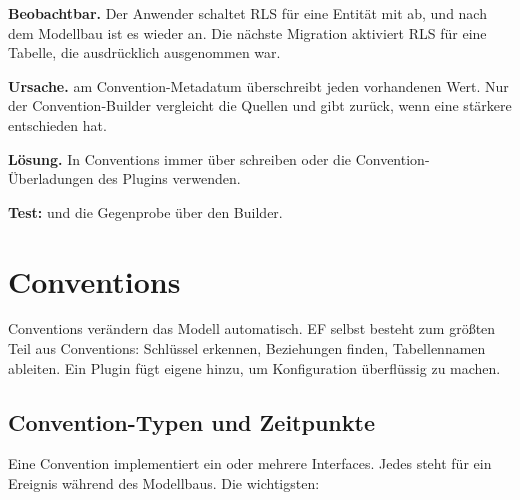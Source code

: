 \begin{failure}
  \textbf{Beobachtbar.} Der Anwender schaltet RLS für eine Entität mit
  ab, und nach dem Modellbau ist es wieder an. Die nächste Migration aktiviert RLS für eine
  Tabelle, die ausdrücklich ausgenommen war.

  \textbf{Ursache.}  am Convention-Metadatum überschreibt
  jeden vorhandenen Wert. Nur der Convention-Builder vergleicht die Quellen und gibt
   zurück, wenn eine stärkere entschieden hat.

  \textbf{Lösung.} In Conventions immer über 
  schreiben oder die Convention-Überladungen des Plugins verwenden.

  \textbf{Test:}
  und die Gegenprobe über den Builder.
\end{failure}

\chapter{Conventions}\label{ch:conventions}

Conventions verändern das Modell automatisch. EF selbst besteht zum größten Teil aus
Conventions: Schlüssel erkennen, Beziehungen finden, Tabellennamen ableiten. Ein Plugin fügt
eigene hinzu, um Konfiguration überflüssig zu machen.

\section{Convention-Typen und Zeitpunkte}

Eine Convention implementiert ein oder mehrere Interfaces. Jedes steht für ein Ereignis
während des Modellbaus. Die wichtigsten:

